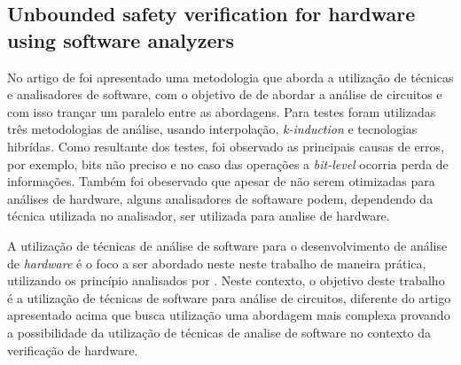 \subsection{Unbounded safety verification for hardware using software analyzers}
No artigo de \citeauthor{mukherjee2016unbounded} foi apresentado uma metodologia que aborda a utilização de técnicas e analisadores de software, com o objetivo de 
de abordar a análise de circuitos e com isso trançar um paralelo entre as abordagens. Para testes foram utilizadas três metodologias de análise, usando interpolação, \textit{k-induction} e tecnologias hibrídas. Como resultante dos testes, foi observado as principais causas de erros, por exemplo, bits não preciso e no caso das operações a \textit{bit-level} ocorria perda de informações. Também foi obeservado que apesar de não serem otimizadas para análises de hardware, alguns analisadores de softaware podem, dependendo da técnica utilizada no analisador, ser utilizada para analise de hardware.

\par
A utilização de técnicas de análise de software para o desenvolvimento de análise de \textit{hardware} é o foco a ser abordado neste neste trabalho de maneira prática, utilizando os princípio analisados por \cite{mukherjee2016unbounded}. Neste contexto, o objetivo deste trabalho é a utilização de técnicas de software para análise de circuitos, diferente do artigo apresentado acima que busca utilização uma abordagem mais complexa provando a possibilidade da utilização de técnicas de analise de software no contexto da verificação de hardware.


